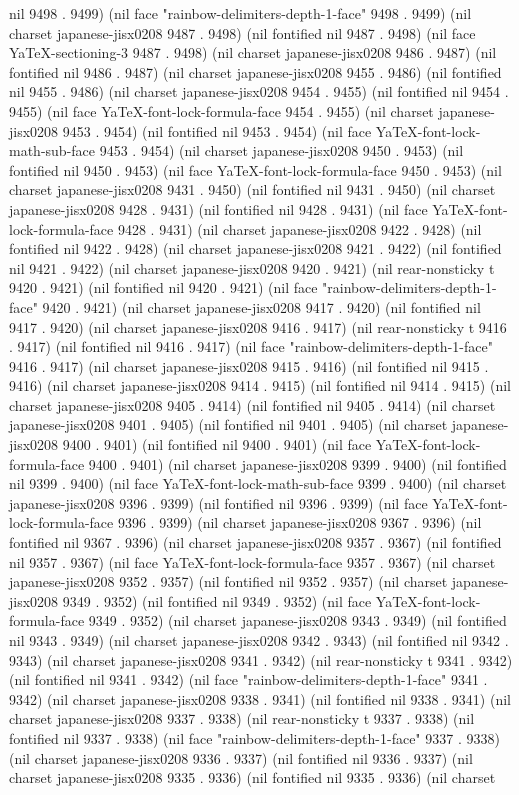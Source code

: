 nil 9498 . 9499) (nil face "rainbow-delimiters-depth-1-face" 9498 . 9499) (nil charset japanese-jisx0208 9487 . 9498) (nil fontified nil 9487 . 9498) (nil face YaTeX-sectioning-3 9487 . 9498) (nil charset japanese-jisx0208 9486 . 9487) (nil fontified nil 9486 . 9487) (nil charset japanese-jisx0208 9455 . 9486) (nil fontified nil 9455 . 9486) (nil charset japanese-jisx0208 9454 . 9455) (nil fontified nil 9454 . 9455) (nil face YaTeX-font-lock-formula-face 9454 . 9455) (nil charset japanese-jisx0208 9453 . 9454) (nil fontified nil 9453 . 9454) (nil face YaTeX-font-lock-math-sub-face 9453 . 9454) (nil charset japanese-jisx0208 9450 . 9453) (nil fontified nil 9450 . 9453) (nil face YaTeX-font-lock-formula-face 9450 . 9453) (nil charset japanese-jisx0208 9431 . 9450) (nil fontified nil 9431 . 9450) (nil charset japanese-jisx0208 9428 . 9431) (nil fontified nil 9428 . 9431) (nil face YaTeX-font-lock-formula-face 9428 . 9431) (nil charset japanese-jisx0208 9422 . 9428) (nil fontified nil 9422 . 9428) (nil charset japanese-jisx0208 9421 . 9422) (nil fontified nil 9421 . 9422) (nil charset japanese-jisx0208 9420 . 9421) (nil rear-nonsticky t 9420 . 9421) (nil fontified nil 9420 . 9421) (nil face "rainbow-delimiters-depth-1-face" 9420 . 9421) (nil charset japanese-jisx0208 9417 . 9420) (nil fontified nil 9417 . 9420) (nil charset japanese-jisx0208 9416 . 9417) (nil rear-nonsticky t 9416 . 9417) (nil fontified nil 9416 . 9417) (nil face "rainbow-delimiters-depth-1-face" 9416 . 9417) (nil charset japanese-jisx0208 9415 . 9416) (nil fontified nil 9415 . 9416) (nil charset japanese-jisx0208 9414 . 9415) (nil fontified nil 9414 . 9415) (nil charset japanese-jisx0208 9405 . 9414) (nil fontified nil 9405 . 9414) (nil charset japanese-jisx0208 9401 . 9405) (nil fontified nil 9401 . 9405) (nil charset japanese-jisx0208 9400 . 9401) (nil fontified nil 9400 . 9401) (nil face YaTeX-font-lock-formula-face 9400 . 9401) (nil charset japanese-jisx0208 9399 . 9400) (nil fontified nil 9399 . 9400) (nil face YaTeX-font-lock-math-sub-face 9399 . 9400) (nil charset japanese-jisx0208 9396 . 9399) (nil fontified nil 9396 . 9399) (nil face YaTeX-font-lock-formula-face 9396 . 9399) (nil charset japanese-jisx0208 9367 . 9396) (nil fontified nil 9367 . 9396) (nil charset japanese-jisx0208 9357 . 9367) (nil fontified nil 9357 . 9367) (nil face YaTeX-font-lock-formula-face 9357 . 9367) (nil charset japanese-jisx0208 9352 . 9357) (nil fontified nil 9352 . 9357) (nil charset japanese-jisx0208 9349 . 9352) (nil fontified nil 9349 . 9352) (nil face YaTeX-font-lock-formula-face 9349 . 9352) (nil charset japanese-jisx0208 9343 . 9349) (nil fontified nil 9343 . 9349) (nil charset japanese-jisx0208 9342 . 9343) (nil fontified nil 9342 . 9343) (nil charset japanese-jisx0208 9341 . 9342) (nil rear-nonsticky t 9341 . 9342) (nil fontified nil 9341 . 9342) (nil face "rainbow-delimiters-depth-1-face" 9341 . 9342) (nil charset japanese-jisx0208 9338 . 9341) (nil fontified nil 9338 . 9341) (nil charset japanese-jisx0208 9337 . 9338) (nil rear-nonsticky t 9337 . 9338) (nil fontified nil 9337 . 9338) (nil face "rainbow-delimiters-depth-1-face" 9337 . 9338) (nil charset japanese-jisx0208 9336 . 9337) (nil fontified nil 9336 . 9337) (nil charset japanese-jisx0208 9335 . 9336) (nil fontified nil 9335 . 9336) (nil charset 